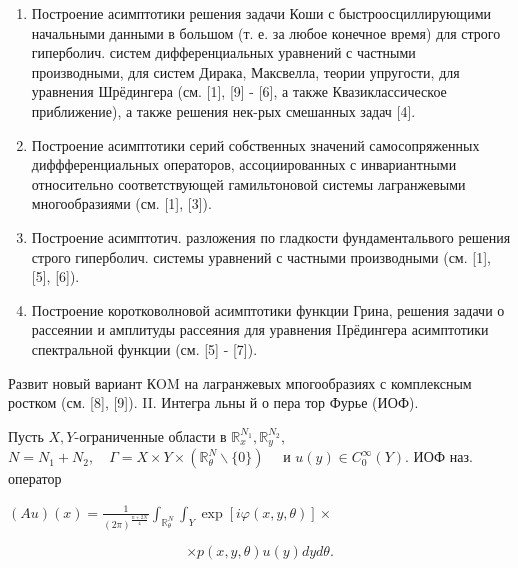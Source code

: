 \documentclass[10pt]{article}
\begin{document}
\begin{enumerate}

  \item Построение асимптотики решения задачи Коши с быстроосциллирующими начальными данными в большом (т. е. за любое конечное время) для строго гиперболич. систем дифференциальных уравнений с частными производными, для систем Дирака, Максвелла, теории упругости, для уравнения Шрёдингера (см. [1], [9] - [6], а также Квазиклассическое приближение), а также решения нек-рых смешанных задач [4].



  \item Построение асимптотики серий собственных значений самосопряженных диффференциальных операторов, ассоциированных с инвариантными относительно соответствующей гамильтоновой системы лагранжевыми многообразиями (см. [1], [3]).



  \item Построение асимптотич. разложения по гладкости фундаментальвого решения строго гиперболич. системы уравнений с частными производными (см. [1], [5], [6]).



  \item Построение коротковолновой асимптотики функции Грина, решения задачи о рассеянии и амплитуды рассеяния для уравнения IIрёдингера асимптотики спектральной функции (см. [5] - [7]).



\end{enumerate}



Развит новый вариант КOM на лагранжевых мпогообразиях с комплексным ростком (см. [8], [9]). II. Интегра льны й $о$ пера тор Фурье (ИОФ).



Пусть $X, Y$-ограниченные области в $\mathbb{R}_{x}^{N_{1}}, \mathbb{R}_{y}^{N_{2}}$, $N=N_{1}+N_{2}, \quad \Gamma=X \times Y \times\left(\mathbb{R}_{\theta}^{N} \backslash\{0\}\right) \quad$ и $u(y) \in C_{0}^{\infty}(Y)$. ИОФ наз. оператор



$(A u)(x)=\frac{1}{(2 \pi)^{\frac{n+2 N}{4}}} \int_{\mathbb{R}_{\theta}^{N}} \int_{Y} \exp [i \varphi(x, y, \theta)] \times$



\[

\times p(x, y, \theta) u(y) d y d \theta .

\]
\end{document}
